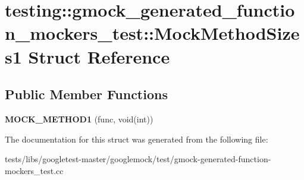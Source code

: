 \hypertarget{structtesting_1_1gmock__generated__function__mockers__test_1_1MockMethodSizes1}{}\section{testing\+:\+:gmock\+\_\+generated\+\_\+function\+\_\+mockers\+\_\+test\+:\+:Mock\+Method\+Sizes1 Struct Reference}
\label{structtesting_1_1gmock__generated__function__mockers__test_1_1MockMethodSizes1}
\subsection*{Public Member Functions}
\begin{DoxyCompactItemize}
\item 
\mbox{\label{structtesting_1_1gmock__generated__function__mockers__test_1_1MockMethodSizes1_af4d80458626303520a848ad15e0e8121}} 
{\bfseries M\+O\+C\+K\+\_\+\+M\+E\+T\+H\+O\+D1} (func, void(int))
\end{DoxyCompactItemize}


The documentation for this struct was generated from the following file\+:\begin{DoxyCompactItemize}
\item 
tests/libs/googletest-\/master/googlemock/test/gmock-\/generated-\/function-\/mockers\+\_\+test.\+cc\end{DoxyCompactItemize}
